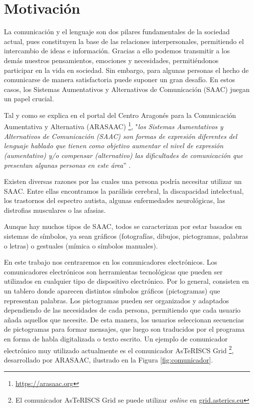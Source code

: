 \documentclass[11pt,spanish,listoffigures,listoftables]{tfgetsinf}
\begin{document}
\section{Motivación}

La comunicación y el lenguaje son dos pilares fundamentales de la sociedad actual, pues constituyen la base de las relaciones interpersonales, permitiendo el intercambio de ideas e información. Gracias a ello podemos transmitir a los demás nuestros pensamientos, emociones y necesidades, permitiéndonos participar en la vida en sociedad. Sin embargo, para algunas personas el hecho de comunicarse de manera satisfactoria puede suponer un gran desafío. En estos casos, los Sistemas Aumentativos y Alternativos de Comunicación (SAAC) juegan un papel crucial.

Tal y como se explica en el portal del Centro Aragonés para la Comunicación Aumentativa y Alternativa (ARASAAC) \footnote{\url{https://arasaac.org}}, "\textit{los Sistemas Aumentativos y Alternativos de Comunicación (SAAC) son formas de expresión diferentes del lenguaje hablado que tienen como objetivo aumentar el nivel de expresión (aumentativo) y/o compensar (alternativo) las dificultades de comunicación que presentan algunas personas en este área}” \cite{arasaac}.

Existen diversas razones por las cuales una persona podría necesitar utilizar un SAAC. Entre ellas encontramos la parálisis cerebral, la discapacidad intelectual, los trastornos del espectro autista, algunas enfermedades neurológicas, las distrofias musculares o las afasias.

Aunque hay muchos tipos de SAAC, todos se caracterizan por estar basados en sistemas de símbolos, ya sean gráficos (fotografías, dibujos, pictogramas, palabras o letras) o gestuales (mímica o símbolos manuales).

En este trabajo nos centraremos en los comunicadores electrónicos. Los comunicadores electrónicos son herramientas tecnológicas que pueden ser utilizados en cualquier tipo de dispositivo electrónico. Por lo general, consisten en un tablero donde aparecen distintos símbolos gráficos (pictogramas) que representan palabras. Los pictogramas pueden ser organizados y adaptados dependiendo de las necesidades de cada persona, permitiendo que cada usuario añada aquellos que necesite. De esta manera, los usuarios seleccionan secuencias de pictogramas para formar mensajes, que luego son traducidos por el programa en forma de habla digitalizada o texto escrito. Un ejemplo de comunicador electrónico muy utilizado actualmente es el comunicador AsTeRISCS Grid \footnote{El comunicador AsTeRISCS Grid se puede utilizar \textit{online} en \url{grid.asterics.eu}}, desarrollado por ARASAAC, ilustrado en la Figura \ref{fig:comunicador}.
\end{document}

